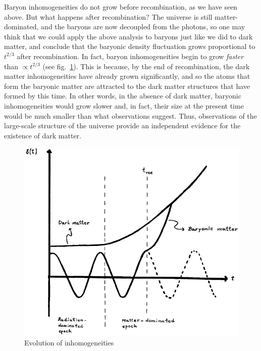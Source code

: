 \documentclass[11pt, a4paper,oneside,openright]{book}
\numberwithin{equation}{section}
\begin{document}
Baryon inhomogeneities do not grow before recombination, as we have seen above. But what happens after recombination? The universe is still matter-dominated, and the baryons are now decoupled from the photons, so one may think that we could apply the above analysis to baryons just like we did to dark matter, and conclude that the baryonic density fluctuation grows proportional to $t^{2/3}$ after recombination. In fact, baryon inhomogeneities begin to grow {\it faster} than $\propto t^{2/3}$ (see fig.\ \ref{fig:lec8_5}). This is because, by the end of recombination, the dark matter inhomogeneities have already grown significantly, and so the atoms that form the baryonic matter are attracted to the dark matter structures that have formed by this time. In other words, in the absence of dark matter, baryonic inhomogeneities would grow slower and, in fact, their size at the present time would be much smaller than what observations suggest. Thus, observations of the large-scale structure of the universe provide an 
independent evidence for the existence of dark matter.
\begin{figure}[ht]
\begin{center}
\includegraphics[scale=0.5]{Draw/lec8_5.png}
\end{center}
\caption{Evolution of inhomogeneities}
\label{fig:lec8_5}
\end{figure}
\end{document}
